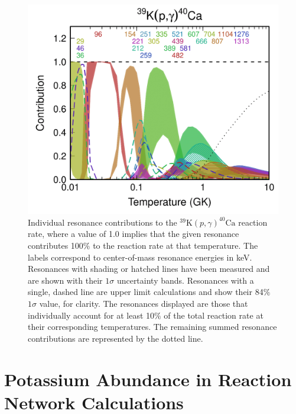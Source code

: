 \begin{figure}[t]
\includegraphics[width=6.5in]{Chapter-6/figs/Contrib_Fox.png} %
\caption{\label{fig:contrib}Individual resonance contributions to the $^{39}\mathrm{K}(p,\gamma)^{40}\mathrm{Ca}$ reaction rate, where a value of 1.0 implies that the given resonance contributes 100$\%$ to the reaction rate at that temperature. The labels correspond to center-of-mass resonance energies in keV. Resonances with shading or hatched lines have been measured and are shown with their $1\sigma$ uncertainty bands. Resonances with a single, dashed line are upper limit calculations and show their 84$\%$ $1\sigma$ value, for clarity. The resonances displayed are those that individually account for at least 10$\%$ of the total reaction rate at their corresponding temperatures. The remaining summed resonance contributions are represented by the dotted line.}
\end{figure}

\section{Potassium Abundance in Reaction Network Calculations}

